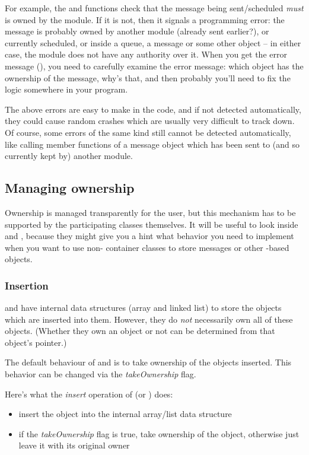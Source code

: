 For example, the  and  functions check
that the message being sent/scheduled \textit{must} is owned by the module.
If it is not, then it signals a programming error: the message is probably
owned by another module (already sent earlier?), or currently scheduled, or
inside a queue, a message or some other object -- in either case, the
module does not have any authority over it. When you get the error message
(), you need to carefully examine the error
message: which object has the ownership of the message, why's that, and
then probably you'll need to fix the logic somewhere in your program.

The above errors are easy to make in the code, and if not detected
automatically, they could cause random crashes which are usually very
difficult to track down. Of course, some errors of the same kind still
cannot be detected automatically, like calling member functions of a
message object which has been sent to (and so currently kept by) another
module.


\subsection{Managing ownership}

Ownership is managed transparently for the user, but this mechanism
has to be supported by the participating classes themselves.
It will be useful to look inside  and ,
because they might give you a hint what behavior you need
to implement when you want to use non-{\opp} container classes
to store messages or other -based objects.


\subsubsection{Insertion}

 and  have internal data structures
(array and linked list) to store the objects which are inserted
into them. However, they do \textit{not} necessarily own all of these
objects.  (Whether they own an object or not can be determined
from that object's  pointer.)

The default behaviour of  and  is
to take ownership of the objects inserted.
This behavior can be changed via the \textit{takeOwnership} flag.

Here's what the \textit{insert} operation of  (or ) does:
\begin{itemize}
    \item{insert the object into the internal array/list data structure}

    \item{if the \textit{takeOwnership} flag is true, take ownership
    of the object, otherwise just leave it with its original owner}
\end{itemize}

